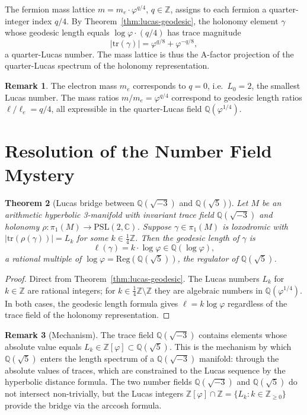 \documentclass[12pt]{article}
\newtheorem{theorem}{Theorem}
\theoremstyle{definition}
\newtheorem{remark}[theorem]{Remark}
\newcommand{\Z}{\mathbb{Z}}
\newcommand{\Q}{\mathbb{Q}}
\newcommand{\C}{\mathbb{C}}
\newcommand{\ph}{\varphi}
\newcommand{\logph}{\log\ph}
\begin{document}
The fermion mass lattice $m = m_e \cdot \ph^{q/4}$, $q \in \Z$,
assigns to each fermion a quarter-integer index $q/4$. By
Theorem~\ref{thm:lucas-geodesic}, the holonomy element $\gamma$
whose geodesic length equals $\logph \cdot (q/4)$ has trace magnitude
\[
  |\mathrm{tr}(\gamma)| = \ph^{q/8} + \ph^{-q/8},
\]
a quarter-Lucas number. The mass lattice is thus the A-factor
projection of the quarter-Lucas spectrum of the holonomy representation.

\begin{remark}
The electron mass $m_e$ corresponds to $q = 0$, i.e.\ $L_0 = 2$,
the smallest Lucas number. The mass ratios $m/m_e = \ph^{q/4}$
correspond to geodesic length ratios $\ell/\ell_e = q/4$, all
expressible in the quarter-Lucas field $\Q(\ph^{1/4})$.
\end{remark}

\section{Resolution of the Number Field Mystery}

\begin{theorem}[Lucas bridge between $\Q(\sqrt{-3})$ and $\Q(\sqrt{5})$]
\label{thm:bridge}
Let $M$ be an arithmetic hyperbolic 3-manifold with invariant trace
field $\Q(\sqrt{-3})$ and holonomy $\rho\colon \pi_1(M) \to
\mathrm{PSL}(2,\C)$. Suppose $\gamma \in \pi_1(M)$ is loxodromic
with $|\mathrm{tr}(\rho(\gamma))| = L_k$ for some $k \in \frac{1}{4}\Z$.
Then the geodesic length of $\gamma$ is
\[
  \ell(\gamma) = k \cdot \logph \in \Q(\logph),
\]
a rational multiple of $\log\ph = \mathrm{Reg}(\Q(\sqrt{5}))$, the
regulator of $\Q(\sqrt{5})$.
\end{theorem}

\begin{proof}
Direct from Theorem~\ref{thm:lucas-geodesic}. The Lucas numbers $L_k$
for $k \in \Z$ are rational integers; for $k \in \frac{1}{4}\Z
\setminus \Z$ they are algebraic numbers in $\Q(\ph^{1/4})$. In
both cases, the geodesic length formula gives $\ell = k\logph$
regardless of the trace field of the holonomy representation.
\end{proof}

\begin{remark}[Mechanism]
The trace field $\Q(\sqrt{-3})$ contains elements whose absolute
value equals $L_k \in \Z[\ph] \subset \Q(\sqrt{5})$. This is the
mechanism by which $\Q(\sqrt{5})$ enters the length spectrum of
a $\Q(\sqrt{-3})$ manifold: through the absolute values of traces,
which are constrained to the Lucas sequence by the hyperbolic
distance formula. The two number fields $\Q(\sqrt{-3})$ and
$\Q(\sqrt{5})$ do not intersect non-trivially, but the Lucas
integers $\Z[\ph] \cap \Z = \{L_k : k \in \Z_{\geq 0}\}$ provide
the bridge via the arccosh formula.
\end{remark}
\end{document}
